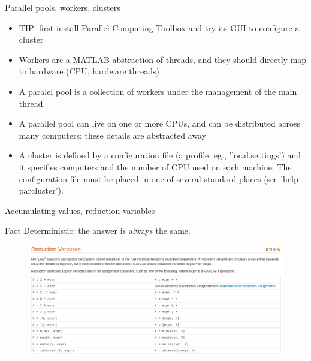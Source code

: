 \documentclass[pdflatex,colorlinks,landscape]{beamer}
\renewcommand\emph[1]{{\color{magenta}#1}}
\begin{document}
\begin{frame}{Parallel pools, workers, clusters}
  \begin{itemize}
  \item TIP: first  install \href{https://www.mathworks.com/products/parallel-computing.html}{Parallel
      Computing Toolbox} and try its GUI to configure a cluster
  \item \emph{Workers} are a MATLAB abstraction of threads, and
    they should directly map to hardware (CPU, hardware threads)
  \item A \emph{paralel pool} is a collection of workers under the
    management of the \emph{main thread}
  \item A parallel pool can live on one or more CPUs, and can be distributed
    across many computers; these details are abstracted away
  \item A \emph{cluster} is defined by a configuration file (a
    \emph{profile}, eg., 'local.settings') and it specifies computers
    and the number of CPU used on each machine. The configuration file
    must be placed in one of several standard places (see 'help
    parcluster').
  \end{itemize}
\end{frame}

\begin{frame}[allowframebreaks]{Accumulating values, reduction variables}
  \begin{small}
    
  \end{small}
  \begin{tiny}
  \end{tiny}
  \begin{block}{Fact}
    Deterministic: the answer is always the same.
  \end{block}

  \begin{figure}
    \includegraphics[width=\textwidth]{MATLAB/ReductionVariables.png}
  \end{figure}
\end{frame}
\end{document}
